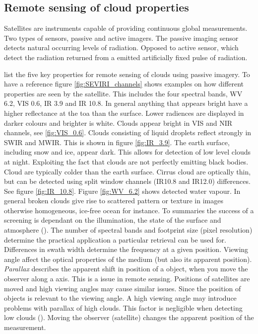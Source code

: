 \subsection{Remote sensing of cloud properties}
Satellites are instruments capable of providing continuous global measurements. Two types of sensors, passive and active imagers. The passive imaging sensor detects natural occurring levels of radiation. Opposed to active sensor, which detect the radiation returned from a emitted artificially fixed pulse of radiation.

\cite{Karlsson2015AdvancingData} list the five key properties for remote sensing of clouds using passive imagery. To have a reference figure \ref{fig:SEVIRI_channels} shows examples on how different properties are seen by the satellite. This includes the four spectral bands, WV 6.2, VIS 0.6, IR 3.9 and IR 10.8. In general anything that appears bright have a higher reflectance at the \acrfull{toa} than the surface. Lower radiences are displayed in darker colours and brighter is white. Clouds appear bright in VIS and NIR channels, see \ref{fig:VIS_0.6}. Clouds consisting of liquid droplets reflect strongly in SWIR and MWIR. This is shown in figure \ref{fig:IR_3.9}. The earth surface, including snow and ice, appear dark. This allows for detection of low level clouds at night. Exploiting the fact that clouds are not perfectly emitting black bodies. Cloud are typically colder than the earth surface. Cirrus cloud are optically thin, but can be detected using split window channels (IR10.8 and IR12.0) differences. See figure \ref{fig:IR_10.8}. Figure \ref{fig:WV_6.2} shows detected water vapour. In general broken clouds give rise to scattered pattern or texture in images otherwise homogeneous, ice-free ocean for instance. To summaries the success of a screening is dependant on the illumination, the state of the surface and atmosphere (\cite{Karlsson2015AdvancingData}).  The number of spectral bands and footprint size (pixel resolution) determine the practical application a particular retrieval can be used for. Differences in swath width determine the frequency at a given position. Viewing angle affect the optical properties of the medium (but also its apparent position). \textit{Parallax} describes the apparent shift in position of a object, when you move the observer along a axis. This is a issue in remote sensing. Positions of satellites are moved and high viewing angles may cause similar issues. Since the position of objects is relevant to the viewing angle. A high viewing angle may introduce problems with parallax of high clouds. This factor is negligible when detecting low clouds (\cite{Joro2010ComparisonFinland}). Moving the observer (satellite) changes the apparent position of the measurement. 

